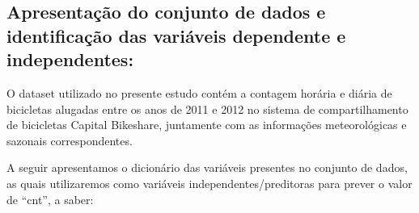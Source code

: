 \documentclass[
  letterpaper,
  DIV=11,
  numbers=noendperiod]{scrartcl}
\begin{document}
\subsection{Apresentação do conjunto de dados e identificação das
variáveis dependente e
independentes:}\label{apresentauxe7uxe3o-do-conjunto-de-dados-e-identificauxe7uxe3o-das-variuxe1veis-dependente-e-independentes}

O dataset utilizado no presente estudo contém a contagem horária e
diária de bicicletas alugadas entre os anos de 2011 e 2012 no sistema de
compartilhamento de bicicletas Capital Bikeshare, juntamente com as
informações meteorológicas e sazonais correspondentes.

A seguir apresentamos o dicionário das variáveis presentes no conjunto
de dados, as quais utilizaremos como variáveis independentes/preditoras
para prever o valor de ``cnt'', a saber:
\end{document}

